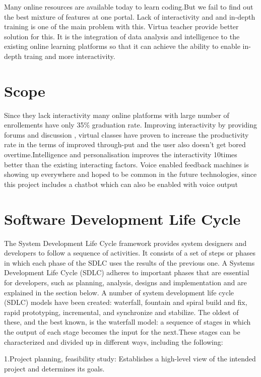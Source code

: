 Many online resources are available today to learn coding.But we fail to find out the best mixture of features at one portal. Lack of interactivity and and in-depth training is one of the main problem with this. Virtua teacher provide better solution for this. It is the integration of data analysis and intelligence to the existing online learning platforms so that it can achieve the ability to enable in-depth traing and more interactivity.


\section{ Scope}
Since they lack interactivity many online platforms with large number of enrollements have only 35\% graduation rate. Improving interactivity by providing forums and discussion , virtual classes have proven to increase the productivity rate in the terms of improved through-put and the user also doesn't get bored overtime.Intelligence and personalisation improves the interactivity 10times better than the existing interacting factors. Voice enabled feedback machines is showing up everywhere and hoped to be common in the future technologies, since this project includes a chatbot which can also be enabled with voice output

\section{ Software Development Life Cycle}

The System Development Life Cycle framework provides system designers and developers to follow a sequence of activities. It consists of a set of steps or phases in which each phase of the SDLC uses the results of the previous one.
A Systems Development Life Cycle (SDLC) adheres to important phases that are essential for developers, such as planning, analysis, designs and implementation and are explained in the section below. A number of system development life cycle (SDLC) models have been created: waterfall, fountain and spiral build and fix, rapid prototyping, incremental, and synchronize and stabilize. The oldest of these, and the best known, is the waterfall model: a sequence of stages in which the output of each stage becomes the input for the next.These stages can be characterized and divided up in different ways, including the following:

1.Project planning, feasibility study: Establishes a high-level view of the intended project and determines its goals.


